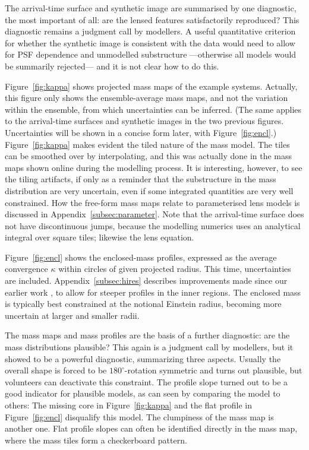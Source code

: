 The arrival-time surface and synthetic image are summarised by one
diagnostic, the most important of all: are the lensed features
satisfactorily reproduced?  This diagnostic remains a judgment call by
modellers.  A useful quantitative criterion for whether the synthetic
image is consistent with the data would need to allow for PSF
dependence and unmodelled substructure ---otherwise all models would
be summarily rejected--- and it is not clear how to do this.

Figure~\ref{fig:kappa} shows projected mass maps of the example
systems.  Actually, this figure only shows the ensemble-average mass
maps, and not the variation within the ensemble, from which
uncertainties can be inferred.  (The same applies to the arrival-time
surfaces and synthetic images in the two previous figures.
Uncertainties will be shown in a concise form later, with
Figure~\ref{fig:encl}.)  Figure~\ref{fig:kappa} makes evident the
tiled nature of the mass model.  The tiles can be smoothed over by
interpolating, and this was actually done in the mass maps shown
online during the modelling process.  It is interesting, however, to
see the tiling artifacts, if only as a reminder that the substructure
in the mass distribution are very uncertain, even if some integrated
quantities are very well constrained.  How the free-form mass maps
relate to parameterised lens models is discussed in
Appendix~\ref{subsec:parameter}.  Note that the arrival-time surface
does not have discontinuous jumps, because the modelling numerics uses
an analytical integral over square tiles; likewise the lens equation.

Figure~\ref{fig:encl} shows the enclosed-mass profiles,
expressed as the average convergence $\kappa$ within circles of given
projected radius.  This time, uncertainties are included.
Appendix~\ref{subsec:hires} describes improvements made since our
earlier work \citep{2015MNRAS.447.2170K}, to allow for steeper
profiles in the inner regions.  The enclosed mass is typically best
constrained at the notional Einstein radius, becoming more uncertain
at larger and smaller radii.

The mass maps and mass profiles are the basis of a further diagnostic: are 
the mass distributions plausible? This again is a judgment call by 
modellers, but it showed to be a powerful diagnostic, summarizing three 
aspects. Usually the overall shape is forced to be $180^\circ$-rotation 
symmetric and turns out plausible, but volunteers can deactivate this 
constraint. The profile slope turned out to be a good indicator for 
plausible models, as can seen by comparing the model  to others: 
The missing core in Figure~\ref{fig:kappa} and the flat profile in 
Figure~\ref{fig:encl} disqualify this model. The clumpiness of the mass 
map is another one. Flat profile slopes can often be identified directly 
in the mass map, where the mass tiles form a checkerboard pattern.


